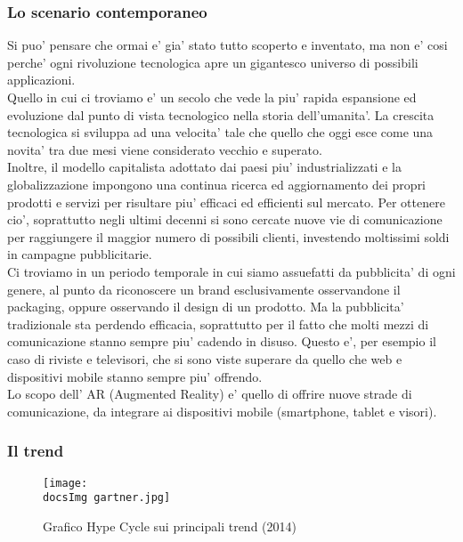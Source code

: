 \subsubsection{Lo scenario contemporaneo}
Si puo' pensare che ormai e' gia' stato tutto scoperto e inventato, ma non e' cosi perche' ogni rivoluzione tecnologica apre un gigantesco universo di possibili applicazioni. 
\\
Quello in cui ci troviamo e' un secolo che vede la piu' rapida espansione ed evoluzione dal punto di vista tecnologico nella storia dell'umanita'. La crescita tecnologica si sviluppa ad una velocita' tale che quello che oggi esce come una novita' tra due mesi viene considerato vecchio e superato.
\\
Inoltre, il modello capitalista adottato dai paesi piu' industrializzati e la globalizzazione impongono una continua ricerca ed aggiornamento dei propri prodotti e servizi per risultare piu' efficaci ed efficienti sul mercato. Per ottenere cio', soprattutto negli ultimi decenni si sono cercate nuove vie di comunicazione per raggiungere il maggior numero di possibili clienti, investendo moltissimi soldi in campagne pubblicitarie.
\\
Ci troviamo in un periodo temporale in cui siamo assuefatti da pubblicita' di ogni genere, al punto da riconoscere un brand esclusivamente osservandone il packaging, oppure osservando il design di un prodotto.
Ma la pubblicita' tradizionale sta perdendo efficacia, soprattutto per il fatto che molti mezzi di comunicazione stanno sempre piu' cadendo in disuso. Questo e', per esempio il caso di riviste e televisori, che si sono viste superare da quello che web e dispositivi mobile stanno sempre piu' offrendo.
\\
Lo scopo dell' AR (Augmented Reality) e' quello di offrire nuove strade di comunicazione, da integrare ai dispositivi mobile (smartphone, tablet e visori).

\subsubsection{Il trend}
\begin{figure}[H]
	\centering
	\texttt{[image: \\docsImg gartner.jpg]}
	\caption{Grafico Hype Cycle sui principali trend (2014)}
	\label{fig: Grafico Hype Cycle sui principali trend (2014)}
\end{figure}

